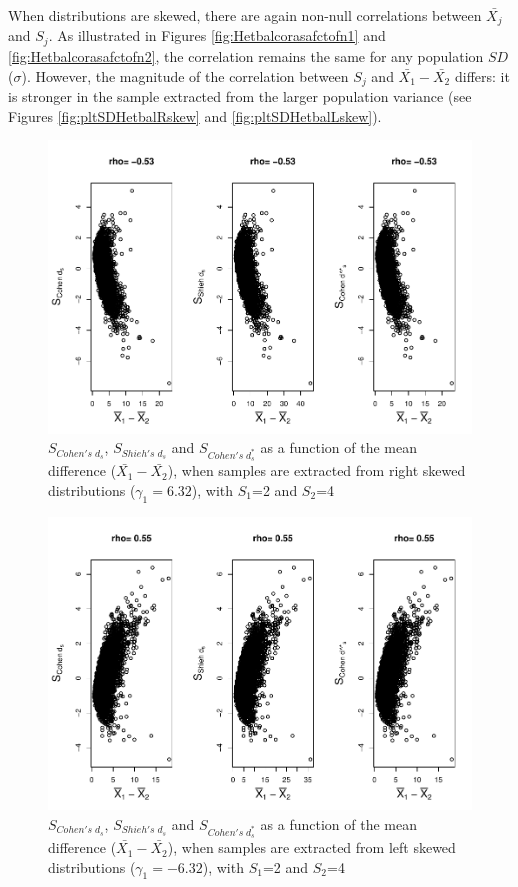 \documentclass[
  english,
  man,mask]{apa6}
\begin{document}
When distributions are skewed, there are again non-null correlations between \(\bar{X_j}\) and \(S_j\). As illustrated in Figures \ref{fig:Hetbalcorasafctofn1} and \ref{fig:Hetbalcorasafctofn2}, the correlation remains the same for any population \(SD\) (\(\sigma\)). However, the magnitude of the correlation between \(S_j\) and \(\bar{X_1}-\bar{X_2}\) differs: it is stronger in the sample extracted from the larger population variance (see Figures \ref{fig:pltSDHetbalRskew} and \ref{fig:pltSDHetbalLskew}).

\begin{figure}
\centering
\includegraphics{Correlation_files/figure-latex/pltStdzrHetbalRskew-1.pdf}
\caption{\label{fig:pltStdzrHetbalRskew}\(S_{Cohen's \; d_s}\), \(S_{Shieh's \; d_s}\) and \(S_{Cohen's \; d^*_s}\) as a function of the mean difference (\(\bar{X_1}-\bar{X_2}\)), when samples are extracted from right skewed distributions (\(\gamma_1 = 6.32\)), with \(S_1\)=2 and \(S_2\)=4}
\end{figure}

\begin{figure}
\centering
\includegraphics{Correlation_files/figure-latex/pltStdzrHetbalLskew-1.pdf}
\caption{\label{fig:pltStdzrHetbalLskew}\(S_{Cohen's \; d_s}\), \(S_{Shieh's \; d_s}\) and \(S_{Cohen's \; d^*_s}\) as a function of the mean difference (\(\bar{X_1}-\bar{X_2}\)), when samples are extracted from left skewed distributions (\(\gamma_1 = -6.32\)), with \(S_1\)=2 and \(S_2\)=4}
\end{figure}
\end{document}
